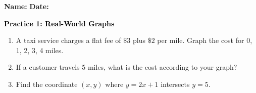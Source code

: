 \documentclass[12pt, letterpaper, fleqn]{article}
\begin{document}
\textbf{Name:} \underline{\hspace{5cm}}
\hfill
\textbf{Date:} \underline{\hspace{3cm}}\\

\begin{tcolorbox}[colback=customteal!20]
    \large\textcolor{black}{\textbf{Practice 1: Real-World Graphs}}
\end{tcolorbox}
\begin{enumerate}[itemsep=3.5cm, leftmargin=0.6cm]
\item A taxi service charges a flat fee of $\$3$ plus $\$2$ per mile. Graph the cost for 0, 1, 2, 3, 4 miles.
\vspace{4cm}
\item If a customer travels 5 miles, what is the cost according to your graph?
\vspace{3cm}
\item Find the coordinate $(x,y)$ where $y = 2x + 1$ intersects $y = 5$.
\end{enumerate}
\end{document}
